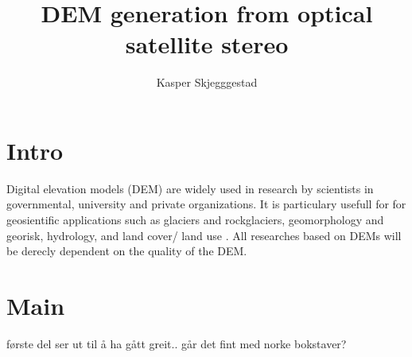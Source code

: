 \documentclass[a4paper,UKenglish]{article}
\title{DEM generation from optical satellite stereo}
\author{Kasper Skjegggestad}
\begin{document}
\maketitle
\tableofcontents

\section{Intro}

Digital elevation models (DEM) are widely used in research by scientists in governmental, university and private organizations. It is particulary usefull for for geosientific applications such as glaciers and rockglaciers, geomorphology and georisk, hydrology, and land cover/ land use \citep{toutin08}. All researches based on DEMs will be derecly dependent on the quality of the DEM.

\section{Main}

første del ser ut til å ha gått greit.. går det fint med norke bokstaver?



\end{document}
